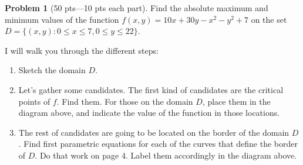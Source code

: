 \documentclass[12pt]{article}
\theoremstyle{definition}
\newtheorem{problem}{Problem}
\begin{document}
\bigskip
\begin{problem}[50 pts---10 pts each part]
Find the absolute maximum and minimum values of the function $f(x,y) = 10x+30y-x^2-y^2+7$ on the set $D = \big\{ (x,y) : 0 \leq x \leq 7, 0 \leq y \leq 22 \big\}$.  

I will walk you through the different steps:
\begin{enumerate}
\item Sketch the domain $D$.

\item Let's gather some candidates.  The first kind of candidates are the critical points of $f$.  Find them.  For those on the domain $D$, place them in the diagram above, and indicate the value of the function in those locations.

\vspace{2cm}
\item The rest of candidates are going to be located on the border of the domain $D$.  Find first parametric equations for each of the curves that define the border of $D$.  Do that work on page 4.  Label them accordingly in the diagram above.


\end{enumerate}
\end{problem}
\end{document}

